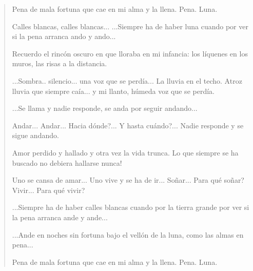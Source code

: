 \documentclass[12pt]{article}
\begin{document}
\clearpage
{}
\begin{verse}
Pena de mala fortuna  
que cae en mi alma y la llena.  
Pena.  
Luna.  
  
Calles blancas, calles blancas...  
...Siempre ha de haber luna cuando  
por ver si la pena arranca  
ando  
y ando...  
  
Recuerdo el rincón oscuro  
en que lloraba en mi infancia:  
los líquenes en los muros,  
las risas a la distancia.  
  
...Sombra.. silencio... una voz  
que se perdía...  
La lluvia en el techo. Atroz  
lluvia que siempre caía...  
y mi llanto, húmeda voz  
que se perdía.  
  
...Se llama y nadie responde,  
se anda por seguir andando...  
  
Andar... Andar... Hacia dónde?...  
Y hasta cuándo?...  
Nadie responde  
y se sigue andando.  
  
Amor perdido y hallado  
y otra vez la vida trunca.  
Lo que siempre se ha buscado  
no debiera hallarse nunca!  
  
Uno se cansa de amar...  
Uno vive y se ha de ir...  
Soñar... Para qué soñar?  
Vivir... Para qué vivir?  
  
...Siempre ha de haber calles blancas  
cuando por la tierra grande  
por ver si la pena arranca  
ande  
y ande...  
  
...Ande en noches sin fortuna  
bajo el vellón de la luna,  
como las almas en pena...  
  
Pena de mala fortuna  
que cae en mi alma y la llena.  
Pena.  
Luna.

\end{verse}
\end{document}

